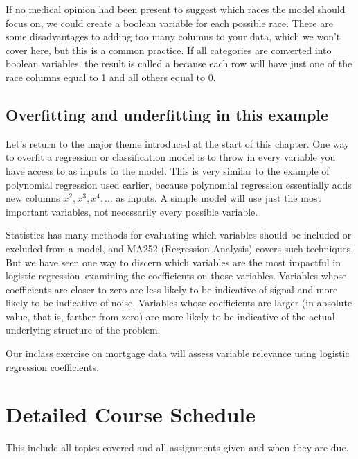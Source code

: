 \documentclass[letterpaper,10pt,english]{sphinxmanual}
\begin{document}
If no medical opinion had been present to suggest which races the model should focus on, we could create a boolean variable for each possible race.  There are some disadvantages to adding too many columns to your data, which we won’t cover here, but this is a common practice.  If all categories are converted into boolean variables, the result is called a  because each row will have just one of the race columns equal to 1 and all others equal to 0.


\section{Overfitting and underfitting in this example}
\label{\detokenize{chapter-17-machine-learning:overfitting-and-underfitting-in-this-example}}
Let’s return to the major theme introduced at the start of this chapter.  One way to overfit a regression or classification model is to throw in every variable you have access to as inputs to the model.  This is very similar to the example of polynomial regression used earlier, because polynomial regression essentially adds new columns \(x^2,x^3,x^4,\ldots\) as inputs.  A simple model will use just the most important variables, not necessarily every possible variable.

Statistics has many methods for evaluating which variables should be included or excluded from a model, and MA252 (Regression Analysis) covers such techniques.  But we have seen one way to discern which variables are the most impactful in logistic regression–examining the coefficients on those variables.  Variables whose coefficients are closer to zero are less likely to be indicative of signal and more likely to be indicative of noise.  Variables whose coefficients are larger (in absolute value, that is, farther from zero) are more likely to be indicative of the actual underlying structure of the problem.

Our in\sphinxhyphen{}class exercise on mortgage data will assess variable relevance using logistic regression coefficients.


\chapter{Detailed Course Schedule}
\label{\detokenize{course-schedule:detailed-course-schedule}}\label{\detokenize{course-schedule::doc}}
This include all topics covered and all assignments given and when they are due.
\end{document}
